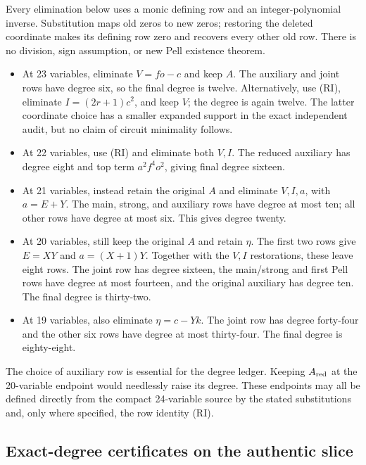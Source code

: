 Every elimination below uses a monic defining row and an integer-polynomial
inverse.  Substitution maps old zeros to new zeros; restoring the deleted
coordinate makes its defining row zero and recovers every other old row.
There is no division, sign assumption, or new Pell existence theorem.

\begin{itemize}
\item At 23 variables, eliminate $V=fo-c$ and keep $A$.  The auxiliary and
joint rows have degree six, so the final degree is twelve.  Alternatively,
use (RI), eliminate $I=(2r+1)c^2$, and keep $V$; the degree is again twelve.
The latter coordinate choice has a smaller expanded support in the exact
independent audit, but no claim of circuit minimality follows.
\item At 22 variables, use (RI) and eliminate both $V,I$.  The reduced
auxiliary has degree eight and top term $a^2f^4o^2$, giving final degree
sixteen.
\item At 21 variables, instead retain the original $A$ and eliminate
$V,I,a$, with $a=E+Y$.  The main, strong, and auxiliary rows have degree at
most ten; all other rows have degree at most six.  This gives degree twenty.
\item At 20 variables, still keep the original $A$ and retain $\eta$.
The first two rows give $E=XY$ and $a=(X+1)Y$.  Together with the $V,I$
restorations, these leave eight rows.  The joint row has degree sixteen,
the main/strong and first Pell rows have degree at most fourteen, and the
original auxiliary has degree ten.  The final degree is thirty-two.
\item At 19 variables, also eliminate $\eta=c-Yk$.  The joint row has
degree forty-four and the other six rows have degree at most thirty-four.
The final degree is eighty-eight.
\end{itemize}

The choice of auxiliary row is essential for the degree ledger.
Keeping $A_{\rm red}$ at the 20-variable endpoint would needlessly raise
its degree.  These endpoints may all be defined directly from the compact
24-variable source by the stated substitutions and, only where specified,
the row identity (RI).

\subsection{Exact-degree certificates on the authentic slice}

